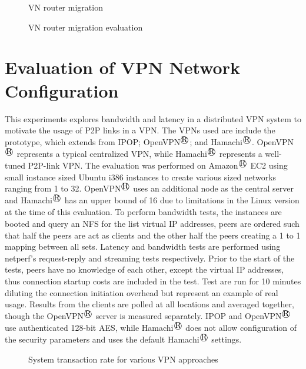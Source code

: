 \begin{figure}
\centering
{}
\caption{VN router migration}
\label{fig:migration_ring}
\end{figure}

\begin{figure}
\centering
{}
\caption{VN router migration evaluation}
\label{fig:mig}
\end{figure}

\section{Evaluation of VPN Network Configuration}

This experiments explores bandwidth and latency in a distributed VPN system to
motivate the usage of P2P links in a VPN.  The VPNs used are include the
prototype, which extends from IPOP; OpenVPN$^\registered$; and Hamachi$^\registered$.  OpenVPN$^\registered$ represents a
typical centralized VPN, while Hamachi$^\registered$ represents a well-tuned P2P-link VPN.
The evaluation was performed on Amazon$^\registered$ EC2 using small instance sized Ubuntu
i386 instances to create various sized networks ranging from 1 to 32.  OpenVPN$^\registered$
uses an additional node as the central server and Hamachi$^\registered$ has an upper bound of
16 due to limitations in the Linux version at the time of this evaluation.  To
perform bandwidth tests, the instances are booted and query an NFS for the list
virtual IP addresses, peers are ordered such that half the peers are act as
clients and the other half the peers creating a 1 to 1 mapping between all
sets.  Latency and bandwidth tests are performed using netperf's request-reply
and streaming tests respectively.  Prior to the start of the tests, peers have
no knowledge of each other, except the virtual IP addresses, thus connection
startup costs are included in the test.  Test are run for 10 minutes diluting
the connection initiation overhead but represent an example of real usage.
Results from the clients are polled at all locations and averaged together,
though the OpenVPN$^\registered$ server is measured separately.  IPOP and OpenVPN$^\registered$ use
authenticated 128-bit AES, while Hamachi$^\registered$ does not allow configuration of the
security parameters and uses the default Hamachi$^\registered$ settings.

\begin{figure}
\centering
{}
\caption{System transaction rate for various VPN approaches}
\label{fig:latency}
\end{figure}

